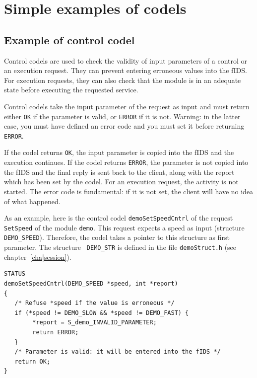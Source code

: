 \section{Simple examples of codels}

\subsection{Example of control codel}
\label{ssec|control|ex}

Control codels are used  to check the  validity of input parameters  of a
control  or  an execution request.    They can prevent entering erroneous
values  into the fIDS. For execution  requests, they can  also check that
the  module  is in   an adequate  state before  executing  the  requested
service.

Control codels take the input parameter of the  request as input and must
return either {\tt OK} if the parameter is valid, or {\tt ERROR} if it is
not. Warning: in the latter case, you must have defined an error code and
you must set it before returning {\tt ERROR}.

If the  codel returns {\tt  OK}, the  input parameter  is copied into the
fIDS and the execution  continues. If the  codel returns {\tt ERROR}, the
parameter is not copied into the fIDS and the final reply is sent back to
the client, along with the report which has been set by the codel. For an
execution  request,  the  activity is  not  started.   The error code  is
fundamental: if it is  not  set, the client   will have no idea  of  what
happened.

As an example, here  is the control  codel {\tt demoSetSpeedCntrl} of  the
request {\tt SetSpeed} of the module {\tt  demo}.  This request expects a
speed as input (structure {\tt DEMO\_SPEED}).  Therefore, the codel takes
a pointer   to  this structure as  first  parameter.   The structure {\tt
DEMO\_STR}  is   defined    in  the    file  {\tt   demoStruct.h}    (see
chapter~\ref{cha|session}).

\begin{center}\begin{cartouche}\small\begin{verbatim}
STATUS
demoSetSpeedCntrl(DEMO_SPEED *speed, int *report)
{
   /* Refuse *speed if the value is erroneous */
   if (*speed != DEMO_SLOW && *speed != DEMO_FAST) {
        *report = S_demo_INVALID_PARAMETER;
        return ERROR;
   }
   /* Parameter is valid: it will be entered into the fIDS */
   return OK;
}
\end{verbatim}\end{cartouche}\end{center}

